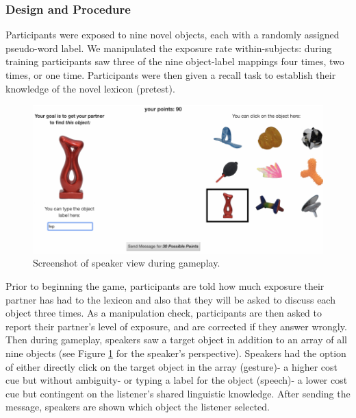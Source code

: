 \documentclass[10pt, letterpaper]{article}
\newenvironment{CodeChunk}{}{}
\begin{document}
\subsubsection{Design and Procedure}\label{design-and-procedure}

Participants were exposed to nine novel objects, each with a randomly
assigned pseudo-word label. We manipulated the exposure rate
within-subjects: during training participants saw three of the nine
object-label mappings four times, two times, or one time. Participants
were then given a recall task to establish their knowledge of the novel
lexicon (pretest).

\begin{CodeChunk}
\begin{figure}[tb]

{\centering \includegraphics{figs/exp_screenshot-1} 

}

\caption[Screenshot of speaker view during gameplay]{Screenshot of speaker view during gameplay.}\label{fig:exp_screenshot}
\end{figure}
\end{CodeChunk}

Prior to beginning the game, participants are told how much exposure
their partner has had to the lexicon and also that they will be asked to
discuss each object three times. As a manipulation check, participants
are then asked to report their partner's level of exposure, and are
corrected if they answer wrongly. Then during gameplay, speakers saw a
target object in addition to an array of all nine objects (see Figure
\ref{fig:exp_screenshot} for the speaker's perspective). Speakers had
the option of either directly click on the target object in the array
(gesture)- a higher cost cue but without ambiguity- or typing a label
for the object (speech)- a lower cost cue but contingent on the
listener's shared linguistic knowledge. After sending the message,
speakers are shown which object the listener selected.
\end{document}

